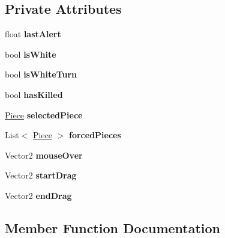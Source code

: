 \subsection*{Private Attributes}
\begin{DoxyCompactItemize}
\item 
\mbox{\label{class_checkers_board_a5823ffc3ec26467dc308ef56cd37b6f9}} 
float {\bfseries last\+Alert}
\item 
\mbox{\label{class_checkers_board_ad6aa356fc5e84ba41ab92b238a73ca00}} 
bool {\bfseries is\+White}
\item 
\mbox{\label{class_checkers_board_afa67e41247a50f69c79fb06df1a7c0cb}} 
bool {\bfseries is\+White\+Turn}
\item 
\mbox{\label{class_checkers_board_a31f268249430780fe39c2bf1515f03e1}} 
bool {\bfseries has\+Killed}
\item 
\mbox{\label{class_checkers_board_a39e2f5c5bc075b400a9c744860b4201b}} 
\mbox{\hyperlink{class_piece}{Piece}} {\bfseries selected\+Piece}
\item 
\mbox{\label{class_checkers_board_aa86020691bd8bc939a5eb0f31e2f2f0d}} 
List$<$ \mbox{\hyperlink{class_piece}{Piece}} $>$ {\bfseries forced\+Pieces}
\item 
\mbox{\label{class_checkers_board_a917d4599e8a6ed06b49cca2a9728f5be}} 
Vector2 {\bfseries mouse\+Over}
\item 
\mbox{\label{class_checkers_board_a4dea41545ca37cf7b87622b5b270599a}} 
Vector2 {\bfseries start\+Drag}
\item 
\mbox{\label{class_checkers_board_a28fc7198f8f726a03dfa89f174019b07}} 
Vector2 {\bfseries end\+Drag}
\end{DoxyCompactItemize}


\subsection{Member Function Documentation}
\mbox{\label{class_checkers_board_a43dfdbc2efbedd0e5a25bd3d6fda391e}} 
